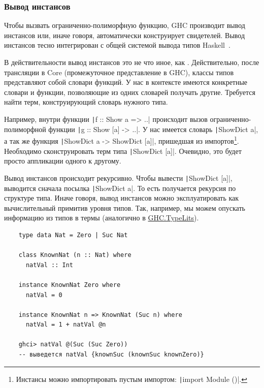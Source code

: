 \subsubsection{Вывод инстансов}

Чтобы вызвать ограниченно-полиморфную функцию, GHC производит вывод инстансов или, иначе говоря, автоматически конструирует свидетелей.
Вывод инстансов тесно интегрирован с общей системой вывода типов Haskell~\cite{spj-type-inference}.

В действительности вывод инстансов это не что иное, как .
Действительно, после трансляции в Core (промежуточное представление в GHC), классы типов представляют собой словари функций.
У нас в контексте имеются конкретные словари и функции, позволяющие из одних словарей получать другие.
Требуется найти терм, конструирующий словарь нужного типа.

Например, внутри функции \texttt|f :: Show a => ..| происходит вызов ограниченно- полиморфной функции
\texttt|g :: Show [a] -> ..|.
У нас имеется словарь \texttt|ShowDict a|, а так же функция \texttt|ShowDict a -> ShowDict [a]|, пришедшая из импортов\footnote{Инстансы можно импортировать пустым импортом: \texttt|import Module ()|.}.
Необходимо сконструировать терм типа \texttt|ShowDict [a]|.
Очевидно, это будет просто аппликации одного к другому.

Вывод инстансов происходит рекурсивно.
Чтобы вывести \texttt|ShowDict [a]|, выводится сначала посылка \texttt|ShowDict a|.
То есть получается рекурсия по структуре типа.
Иначе говоря, вывод инстансов можно эксплуатировать как вычислительный примитив уровня типов.
Так, например, мы можем опускать информацию из типов в термы (аналогично в \href{https://hackage.haskell.org/package/base-4.20.0.1/docs/GHC-TypeLits.html}{GHC.TypeLits}).
\begin{verbatim}
    type data Nat = Zero | Suc Nat

    class KnownNat (n :: Nat) where
      natVal :: Int

    instance KnownNat Zero where
      natVal = 0

    instance KnownNat n => KnownNat (Suc n) where
      natVal = 1 + natVal @n

    ghci> natVal @(Suc (Suc Zero))
    -- выведется natVal {knownSuc (knownSuc knownZero)}
\end{verbatim}


